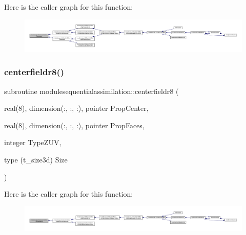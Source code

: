 Here is the caller graph for this function\+:\nopagebreak
\begin{figure}[H]
\begin{center}
\leavevmode
\includegraphics[width=350pt]{namespacemodulesequentialassimilation_a2481d2ea20d9e305e0090e324dd3893e_icgraph}
\end{center}
\end{figure}
\mbox{\label{namespacemodulesequentialassimilation_aa1246853229add1c591a38826af67ea2}} 
\subsubsection{\texorpdfstring{centerfieldr8()}{centerfieldr8()}}
{\footnotesize\ttfamily subroutine modulesequentialassimilation\+::centerfieldr8 (\begin{DoxyParamCaption}\item[{real(8), dimension(\+:, \+:, \+:), pointer}]{Prop\+Center,  }\item[{real(8), dimension(\+:, \+:, \+:), pointer}]{Prop\+Faces,  }\item[{integer}]{Type\+Z\+UV,  }\item[{type (t\+\_\+size3d)}]{Size }\end{DoxyParamCaption})\hspace{0.3cm}{\ttfamily [private]}}

Here is the caller graph for this function\+:\nopagebreak
\begin{figure}[H]
\begin{center}
\leavevmode
\includegraphics[width=350pt]{namespacemodulesequentialassimilation_aa1246853229add1c591a38826af67ea2_icgraph}
\end{center}
\end{figure}
\mbox{\label{namespacemodulesequentialassimilation_aeee40d5724f1d4056ec3c81965e2d7c8}} 
